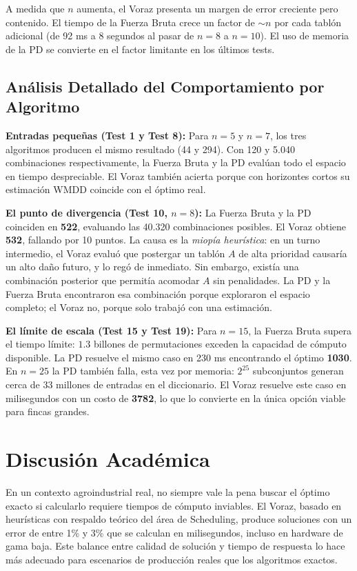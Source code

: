 \documentclass[conference, a4paper]{IEEEtran}
\begin{document}
A medida que $n$ aumenta, el Voraz presenta un margen de error creciente pero contenido. El tiempo de la Fuerza Bruta crece un factor de $\sim n$ por cada tablón adicional (de 92 ms a 8 segundos al pasar de $n=8$ a $n=10$). El uso de memoria de la PD se convierte en el factor limitante en los últimos tests.

\subsection{Análisis Detallado del Comportamiento por Algoritmo}

\textbf{Entradas pequeñas (Test 1 y Test 8):}
Para $n=5$ y $n=7$, los tres algoritmos producen el mismo resultado (44 y 294). Con 120 y 5.040 combinaciones respectivamente, la Fuerza Bruta y la PD evalúan todo el espacio en tiempo despreciable. El Voraz también acierta porque con horizontes cortos su estimación WMDD coincide con el óptimo real.

\textbf{El punto de divergencia (Test 10, $n=8$):}
La Fuerza Bruta y la PD coinciden en \textbf{522}, evaluando las 40.320 combinaciones posibles. El Voraz obtiene \textbf{532}, fallando por 10 puntos. La causa es la \textit{miopía heurística}: en un turno intermedio, el Voraz evaluó que postergar un tablón $A$ de alta prioridad causaría un alto daño futuro, y lo regó de inmediato. Sin embargo, existía una combinación posterior que permitía acomodar $A$ sin penalidades. La PD y la Fuerza Bruta encontraron esa combinación porque exploraron el espacio completo; el Voraz no, porque solo trabajó con una estimación.

\textbf{El límite de escala (Test 15 y Test 19):}
Para $n=15$, la Fuerza Bruta supera el tiempo límite: $1.3$ billones de permutaciones exceden la capacidad de cómputo disponible. La PD resuelve el mismo caso en 230 ms encontrando el óptimo \textbf{1030}. En $n=25$ la PD también falla, esta vez por memoria: $2^{25}$ subconjuntos generan cerca de 33 millones de entradas en el diccionario. El Voraz resuelve este caso en milisegundos con un costo de \textbf{3782}, lo que lo convierte en la única opción viable para fincas grandes.

\section{Discusión Académica}
En un contexto agroindustrial real, no siempre vale la pena buscar el óptimo exacto si calcularlo requiere tiempos de cómputo inviables. El Voraz, basado en heurísticas con respaldo teórico del área de Scheduling, produce soluciones con un error de entre 1\% y 3\% que se calculan en milisegundos, incluso en hardware de gama baja. Este balance entre calidad de solución y tiempo de respuesta lo hace más adecuado para escenarios de producción reales que los algoritmos exactos.
\end{document}
